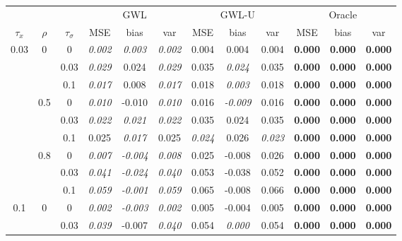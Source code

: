 \documentclass[authoryear, review, 11pt]{elsarticle}
\begin{document}
\begin{table}[ht]
\begin{center}
\begin{tabular}{ccc | ccc | ccc | ccc }
&&&\multicolumn{3}{c}{GWL}&\multicolumn{3}{c}{GWL-U}&\multicolumn{3}{c}{Oracle}\\$\tau_x$ & $\rho$ & $\tau_\sigma$ & MSE & bias & var &  MSE & bias & var &  MSE & bias & var\\   \hline
\multirow{9}{*}{0.03} & \multirow{3}{*}{0} & 0 & \emph{0.002} & \emph{0.003} & \emph{0.002} & 0.004 & 0.004 & 0.004 & \textbf{0.000} & \textbf{0.000} & \textbf{0.000} \\ 
 &  & 0.03 &   \emph{0.029} & 0.024 & \emph{0.029} & 0.035 & \emph{0.024} & 0.035 & \textbf{0.000} & \textbf{0.000} & \textbf{0.000} \\ 
 &  & 0.1 &   \emph{0.017} & 0.008 & \emph{0.017} & 0.018 & \emph{0.003} & 0.018 & \textbf{0.000} & \textbf{0.000} & \textbf{0.000} \\ \cline{2-12}
 & \multirow{3}{*}{0.5} & 0 &   \emph{0.010} & -0.010 & \emph{0.010} & 0.016 & \emph{-0.009} & 0.016 & \textbf{0.000} & \textbf{0.000} & \textbf{0.000} \\ 
 &  & 0.03 &   \emph{0.022} & \emph{0.021} & \emph{0.022} & 0.035 & 0.024 & 0.035 & \textbf{0.000} & \textbf{0.000} & \textbf{0.000} \\ 
 &  & 0.1 &   0.025 & \emph{0.017} & 0.025 & \emph{0.024} & 0.026 & \emph{0.023} & \textbf{0.000} & \textbf{0.000} & \textbf{0.000} \\ \cline{2-12}
 & \multirow{3}{*}{0.8} & 0 &   \emph{0.007} & \emph{-0.004} & \emph{0.008} & 0.025 & -0.008 & 0.026 & \textbf{0.000} & \textbf{0.000} & \textbf{0.000} \\ 
 &  & 0.03 &   \emph{0.041} & \emph{-0.024} & \emph{0.040} & 0.053 & -0.038 & 0.052 & \textbf{0.000} & \textbf{0.000} & \textbf{0.000} \\ 
 &  & 0.1 &   \emph{0.059} & \emph{-0.001} & \emph{0.059} & 0.065 & -0.008 & 0.066 & \textbf{0.000} & \textbf{0.000} & \textbf{0.000} \\ \cline{1-12}
\multirow{9}{*}{0.1} & \multirow{3}{*}{0} & 0 &   \emph{0.002} & \emph{-0.003} & \emph{0.002} & 0.005 & -0.004 & 0.005 & \textbf{0.000} & \textbf{0.000} & \textbf{0.000} \\ 
 &  & 0.03 &   \emph{0.039} & -0.007 & \emph{0.040} & 0.054 & \emph{0.000} & 0.054 & \textbf{0.000} & \textbf{0.000} & \textbf{0.000} \\ 

\end{tabular}
\end{center}
\end{table}
\end{document}
